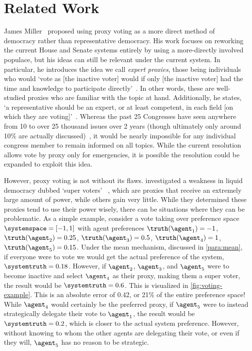 \section{Related Work}\label{sec:related-work}
James Miller~\cite{Miller1969} proposed using proxy voting as a more direct
method of democracy rather than representative democracy.
His work focuses on reworking the current House and Senate systems entirely by using a
more-directly involved populace, but his ideas can still be relevant under the current
system.
In particular, he introduces the idea we call \textit{expert proxies},
those being individuals who would `vote as [the inactive voter] would if only
[the inactive voter] had the time and knowledge to participate
directly'~\cite[para.~1.3]{Miller1969}.
In other words, these are well-studied proxies who are familiar with the topic at hand.
Additionally, he states, `a representative should be an expert, or at least
competent, in each field [on which they are voting]'~\cite[para.~2.7]{Miller1969}.
Whereas the past 25 Congresses have seen anywhere from 10 to over 25 thousand issues
over 2 years (though ultimately only around 10\% are actually
discussed)~\cite{GovTrack2022}, it would be nearly impossible for any individual
congress member to remain informed on all topics.
While the current resolution allows vote by proxy only for emergencies, it is
possible the resolution could be expanded to exploit this idea.

However, proxy voting is not without its flaws.
 investigated a weakness in liquid democracy dubbed `super voters'
~\cite[para.~1.3]{Kling2015}, which are proxies that receive an extremely large
amount of power, while others gain very little.
While they determined these proxies tend to use their power wisely, there can be
situations where they can be problematic.
As a simple example, consider a vote taking over preference
space $\systemspace = [-1, 1]$ with agent preferences $\truthof{\agent_1} = -1$,
$\truthof{\agent_2} = 0.25$, $\truthof{\agent_3} = 0.5$, $\truthof{\agent_4} = 1$,
$\truthof{\agent_5} = 0.15$.
Under the mean mechanism, discussed in \autoref{para:mean}, if everyone were to vote
we would get the actual preference of the system, $\systemtruth = 0.18$.
However, if $\agent_2$, $\agent_3$, and $\agent_5$ were to become inactive and select
$\agent_4$ as their proxy, making them a super voter, the result would be
$\systemtruth = 0.6$.
This is visualized in \autoref{fig:voting-example}.
This is an absolute error of 0.42, or 21\% of the entire preference space!
While $\agent_4$ would certainly be the preferred proxy, if $\agent_5$ were to
instead strategically delegate their vote to $\agent_1$, the result would
be $\systemtruth = 0.2$, which is closer to the actual system preference.
However, without knowing to whom the other agents are delegating their vote, or even
if they will, $\agent_5$ has no reason to be strategic.

